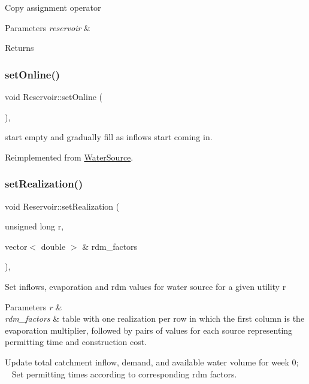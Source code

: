 Copy assignment operator 
\begin{DoxyParams}{Parameters}
{\em reservoir} & \\
\hline
\end{DoxyParams}
\begin{DoxyReturn}{Returns}

\end{DoxyReturn}
\mbox{\label{classReservoir_ac6f64dd92c401e58095e7b125855041b_ac6f64dd92c401e58095e7b125855041b}} 
\subsubsection{\texorpdfstring{set\+Online()}{setOnline()}}
{\footnotesize\ttfamily void Reservoir\+::set\+Online (\begin{DoxyParamCaption}{ }\end{DoxyParamCaption})\hspace{0.3cm}{\ttfamily [override]}, {\ttfamily [virtual]}}

start empty and gradually fill as inflows start coming in. 

Reimplemented from \mbox{\hyperlink{classWaterSource_ab3396e2915db91a6c82e0f29c7889df4_ab3396e2915db91a6c82e0f29c7889df4}{Water\+Source}}.

\mbox{\label{classReservoir_ad1bb7aa46397719d09e0b6188b9bc28d_ad1bb7aa46397719d09e0b6188b9bc28d}} 
\subsubsection{\texorpdfstring{set\+Realization()}{setRealization()}}
{\footnotesize\ttfamily void Reservoir\+::set\+Realization (\begin{DoxyParamCaption}\item[{unsigned long}]{r,  }\item[{vector$<$ double $>$ \&}]{rdm\+\_\+factors }\end{DoxyParamCaption})\hspace{0.3cm}{\ttfamily [override]}, {\ttfamily [virtual]}}

Set inflows, evaporation and rdm values for water source for a given utility r 
\begin{DoxyParams}{Parameters}
{\em r} & \\
\hline
{\em rdm\+\_\+factors} & table with one realization per row in which the first column is the evaporation multiplier, followed by pairs of values for each source representing permitting time and construction cost. \\
\hline
\end{DoxyParams}
Update total catchment inflow, demand, and available water volume for week 0; ~\newline
~\newline
 Set permitting times according to corresponding rdm factors.

